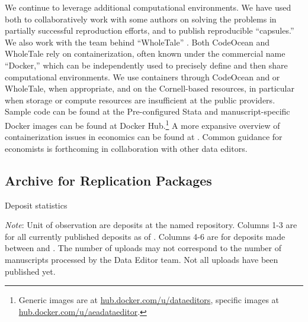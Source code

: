 We continue to leverage additional computational environments. We have used  \citep{clyburne-sherin_computational_2019} both to collaboratively work with some authors on solving the problems in   partially successful reproduction efforts, and to publish reproducible ``capsules.'' We also work with the team behind ``WholeTale'' \citep{BrinckmanFutureGener.Comput.Syst.2018}. Both {{CodeOcean}} and WholeTale rely on containerization, often known under the commercial name ``Docker,'' which can be independently used to precisely define and then share computational environments. We use containers through CodeOcean and or WholeTale, when appropriate, and on the Cornell-based resources, in particular when storage or compute resources are insufficient at the public providers. Sample code  can be found at the  Pre-configured Stata and manuscript-specific Docker images can be found at Docker Hub.\footnote{Generic images are at \href{https://hub.docker.com/u/dataeditors}{hub.docker.com/u/dataeditors}, specific images at \href{https://hub.docker.com/u/aeadataeditor}{hub.docker.com/u/aeadataeditor}.} A more expansive overview of containerization issues in economics can be found at \citet{aea_data_editor_use_2021}. Common guidance for economists is forthcoming in collaboration with other data editors.


\subsection{Archive for Replication Packages}


\begin{table}[t]
    \centering
    \caption{Deposit statistics}
    \label{tab:webstats}
     \begin{threeparttable}
     
 
    \begin{tablenotes}
    \footnotesize
    \item[] \textit{Note}: Unit of observation are deposits at the named repository. Columns 1-3 are for all currently published deposits as of \pkglastday{}. Columns 4-6 are for deposits made between \firstday{} and \pkglastday{}. The number of uploads may not correspond to the number of manuscripts processed by the Data Editor team. Not all uploads have been published yet. 
    \end{tablenotes}
    \end{threeparttable}
\end{table}


